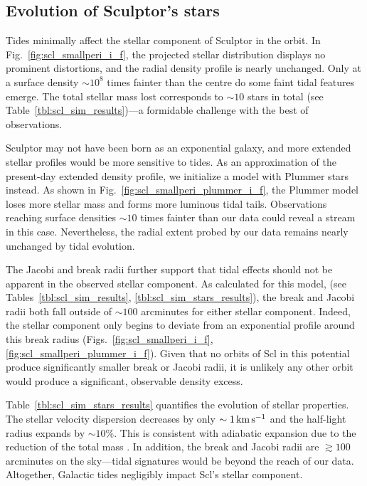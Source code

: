 \subsection{Evolution of Sculptor's
stars}\label{evolution-of-sculptors-stars}

Tides minimally affect the stellar component of Sculptor in the
\smallperi{} orbit. In Fig.~\ref{fig:scl_smallperi_i_f}, the projected
stellar distribution displays no prominent distortions, and the radial
density profile is nearly unchanged. Only at a surface density
\(\sim10^8\) times fainter than the centre do some faint tidal features
emerge. The total stellar mass lost corresponds to \(\sim 10\) stars in
total (see Table~\ref{tbl:scl_sim_results})---a formidable challenge
with the best of observations.

Sculptor may not have been born as an exponential galaxy, and more
extended stellar profiles would be more sensitive to tides. As an
approximation of the present-day extended density profile, we initialize
a model with Plummer stars instead. As shown in
Fig.~\ref{fig:scl_smallperi_plummer_i_f}, the Plummer model loses more
stellar mass and forms more luminous tidal tails. Observations reaching
surface densities \(\sim10\) times fainter than our data could reveal a
stream in this case. Nevertheless, the radial extent probed by our data
remains nearly unchanged by tidal evolution.

The Jacobi and break radii further support that tidal effects should not
be apparent in the observed stellar component. As calculated for this
model, (see
Tables~\ref{tbl:scl_sim_results}, \ref{tbl:scl_sim_stars_results}), the
break and Jacobi radii both fall outside of \(\sim 100\) arcminutes for
either stellar component. Indeed, the stellar component only begins to
deviate from an exponential profile around this break radius
(Figs.~\ref{fig:scl_smallperi_i_f}, \ref{fig:scl_smallperi_plummer_i_f}).
Given that no orbits of Scl in this potential produce significantly
smaller break or Jacobi radii, it is unlikely any other orbit would
produce a significant, observable density excess.

Table~\ref{tbl:scl_sim_stars_results} quantifies the evolution of
stellar properties. The stellar velocity dispersion decreases by only
\(\sim1\,{\rm km\,s^{-1}}\) and the half-light radius expands by \(\sim 10\%\). This
is consistent with adiabatic expansion due to the reduction of the total
mass \citep[e.g.,][]{stucker+2023}. In addition, the break and Jacobi
radii are \(\gtrsim 100\) arcminutes on the sky---tidal signatures would
be beyond the reach of our data. Altogether, Galactic tides negligibly
impact Scl's stellar component.

